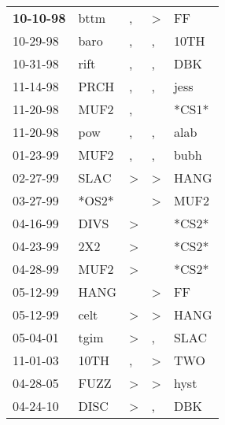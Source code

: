 \begin{supertabular}{p{0.07\textwidth}p{0.06\textwidth}p{0.02\textwidth}p{0.02\textwidth}p{0.06\textwidth}}
 \textbf{10-10-98\textsuperscript{}} &  bttm\textsuperscript{} &             , &  \textgreater &    FF\textsuperscript{} \\
          10-29-98\textsuperscript{} &  baro\textsuperscript{} &             , &             , &  10TH\textsuperscript{} \\
          10-31-98\textsuperscript{} &  rift\textsuperscript{} &             , &             , &   DBK\textsuperscript{} \\
          11-14-98\textsuperscript{} &  PRCH\textsuperscript{} &             , &             , &  jess\textsuperscript{} \\
          11-20-98\textsuperscript{} &  MUF2\textsuperscript{} &             , &               &                   *CS1* \\
          11-20-98\textsuperscript{} &   pow\textsuperscript{} &             , &             , &  alab\textsuperscript{} \\
          01-23-99\textsuperscript{} &  MUF2\textsuperscript{} &             , &             , &  bubh\textsuperscript{} \\
          02-27-99\textsuperscript{} &  SLAC\textsuperscript{} &  \textgreater &  \textgreater &  HANG\textsuperscript{} \\
          03-27-99\textsuperscript{} &                   *OS2* &               &  \textgreater &  MUF2\textsuperscript{} \\
          04-16-99\textsuperscript{} &  DIVS\textsuperscript{} &  \textgreater &               &                   *CS2* \\
          04-23-99\textsuperscript{} &   2X2\textsuperscript{} &  \textgreater &               &                   *CS2* \\
          04-28-99\textsuperscript{} &  MUF2\textsuperscript{} &  \textgreater &               &                   *CS2* \\
          05-12-99\textsuperscript{} &  HANG\textsuperscript{} &               &  \textgreater &    FF\textsuperscript{} \\
          05-12-99\textsuperscript{} &  celt\textsuperscript{} &  \textgreater &  \textgreater &  HANG\textsuperscript{} \\
          05-04-01\textsuperscript{} &  tgim\textsuperscript{} &  \textgreater &             , &  SLAC\textsuperscript{} \\
          11-01-03\textsuperscript{} &  10TH\textsuperscript{} &             , &  \textgreater &   TWO\textsuperscript{} \\
          04-28-05\textsuperscript{} &  FUZZ\textsuperscript{} &  \textgreater &  \textgreater &  hyst\textsuperscript{} \\
          04-24-10\textsuperscript{} &  DISC\textsuperscript{} &  \textgreater &             , &   DBK\textsuperscript{} \\
\end{supertabular}
